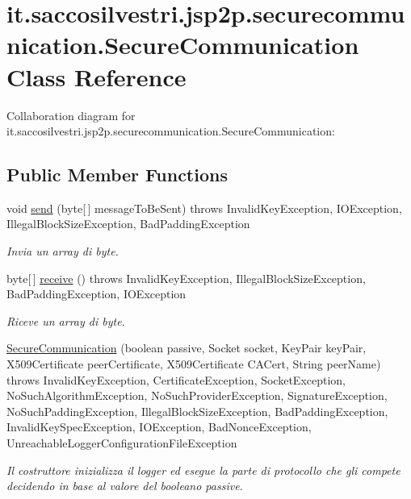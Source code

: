\hypertarget{classit_1_1saccosilvestri_1_1jsp2p_1_1securecommunication_1_1_secure_communication}{
\section{it.saccosilvestri.jsp2p.securecommunication.\-Secure\-Communication \-Class \-Reference}
\label{classit_1_1saccosilvestri_1_1jsp2p_1_1securecommunication_1_1_secure_communication}
}


\-Collaboration diagram for it.saccosilvestri.jsp2p.securecommunication.\-Secure\-Communication\-:
\subsection*{\-Public \-Member \-Functions}
\begin{DoxyCompactItemize}
\item 
void \hyperlink{classit_1_1saccosilvestri_1_1jsp2p_1_1securecommunication_1_1_secure_communication_ab5b1a396ec73873683012ac34084e3f9}{send} (byte\mbox{[}$\,$\mbox{]} message\-To\-Be\-Sent)  throws Invalid\-Key\-Exception, 			\-I\-O\-Exception, Illegal\-Block\-Size\-Exception, Bad\-Padding\-Exception 
\begin{DoxyCompactList}\small\item\em \-Invia un array di byte. \end{DoxyCompactList}\item 
byte\mbox{[}$\,$\mbox{]} \hyperlink{classit_1_1saccosilvestri_1_1jsp2p_1_1securecommunication_1_1_secure_communication_a4bbde1476c9e908ee569b00d0e0f106c}{receive} ()  throws Invalid\-Key\-Exception, 			\-Illegal\-Block\-Size\-Exception, Bad\-Padding\-Exception, I\-O\-Exception 
\begin{DoxyCompactList}\small\item\em \-Riceve un array di byte. \end{DoxyCompactList}\item 
\hyperlink{classit_1_1saccosilvestri_1_1jsp2p_1_1securecommunication_1_1_secure_communication_a4007043b898d6773ed536da026adea5f}{\-Secure\-Communication} (boolean passive, \-Socket socket, \-Key\-Pair key\-Pair, \-X509\-Certificate peer\-Certificate, \-X509\-Certificate \-C\-A\-Cert, \-String peer\-Name)  throws Invalid\-Key\-Exception, Certificate\-Exception, Socket\-Exception, 			\-No\-Such\-Algorithm\-Exception, No\-Such\-Provider\-Exception, 			\-Signature\-Exception, No\-Such\-Padding\-Exception, 			\-Illegal\-Block\-Size\-Exception, Bad\-Padding\-Exception, 			\-Invalid\-Key\-Spec\-Exception, I\-O\-Exception, Bad\-Nonce\-Exception, Unreachable\-Logger\-Configuration\-File\-Exception 
\begin{DoxyCompactList}\small\item\em \-Il costruttore inizializza il logger ed esegue la parte di protocollo che gli compete decidendo in base al valore del booleano passive. \end{DoxyCompactList}\end{DoxyCompactItemize}
